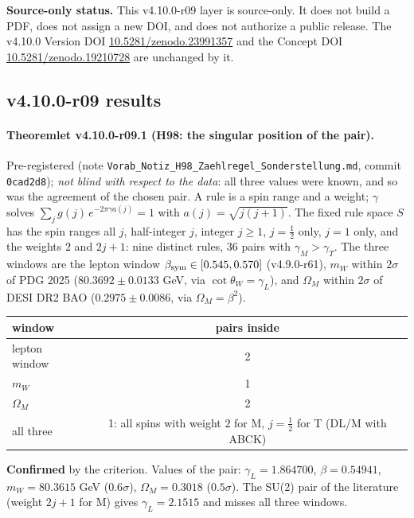 \noindent\textbf{Source-only status.}
This v4.10.0-r09 layer is source-only.  It does not build a PDF, does not assign a new DOI,
and does not authorize a public release.  The v4.10.0 Version DOI
\href{https://doi.org/10.5281/zenodo.23991357}{10.5281/zenodo.23991357} and the Concept DOI
\href{https://doi.org/10.5281/zenodo.19210728}{10.5281/zenodo.19210728} are unchanged by it.

\subsection*{v4.10.0-r09 results}
\label{subsec:v4100-r09-results}

\paragraph{Theoremlet v4.10.0-r09.1 (H98: the singular position of the pair).}
Pre-registered (note \texttt{Vorab\_\allowbreak Notiz\_\allowbreak H98\_\allowbreak Zaehlregel\_\allowbreak Sonderstellung.md}, commit \texttt{0cad2d8}); \emph{not blind with respect to
the data}: all three values were known, and so was the agreement of the chosen pair.  A rule is a spin range and a weight; \(\gamma\) solves
\(\sum_j g(j)\,e^{-2\pi\gamma a(j)}=1\) with \(a(j)=\sqrt{j(j+1)}\).  The fixed rule space \(S\) has the spin ranges all \(j\), half-integer \(j\), integer
\(j\ge1\), \(j=\tfrac12\) only, \(j=1\) only, and the weights \(2\) and \(2j+1\): nine distinct rules, \(36\) pairs with \(\gamma_M>\gamma_T\).  The three windows are the
lepton window \(\beta_{\rm sym}\in[0.545,0.570]\) (v4.9.0-r61), \(m_W\) within \(2\sigma\) of PDG 2025 (\(80.3692\pm0.0133\) GeV, via \(\cot\theta_W=\gamma_L\)), and
\(\Omega_M\) within \(2\sigma\) of DESI DR2 BAO (\(0.2975\pm0.0086\), via \(\Omega_M=\beta^2\)).
\begin{center}
\small
\begin{tabular}{@{}lc@{}}
\toprule
window & pairs inside\\
\midrule
lepton window & 2\\
\(m_W\) & 1\\
\(\Omega_M\) & 2\\
all three & 1: all spins with weight \(2\) for M, \(j=\tfrac12\) for T (DL/M with ABCK)\\
\bottomrule
\end{tabular}
\end{center}
\textbf{Confirmed} by the criterion.  Values of the pair: \(\gamma_L=1.864700\), \(\beta=0.54941\), \(m_W=80.3615\) GeV (\(0.6\sigma\)), \(\Omega_M=0.3018\) (\(0.5\sigma\)).  The
SU(2) pair of the literature (weight \(2j+1\) for M) gives \(\gamma_L=2.1515\) and misses all three windows.

